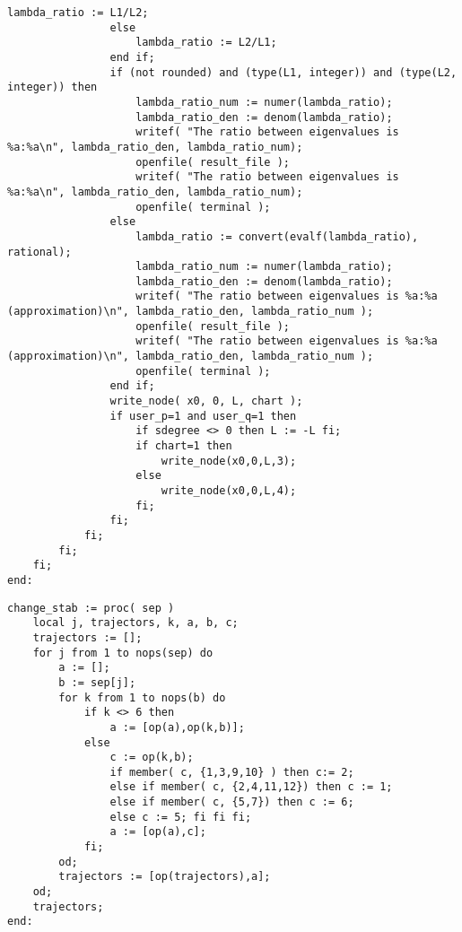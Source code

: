 \documentclass[a4paper,10pt]{article}
\begin{document}
\begin{lstlisting}[name=infinity]
                    lambda_ratio := L1/L2;
                else
                    lambda_ratio := L2/L1;
                end if;
                if (not rounded) and (type(L1, integer)) and (type(L2, integer)) then 
                    lambda_ratio_num := numer(lambda_ratio);
                    lambda_ratio_den := denom(lambda_ratio);
                    writef( "The ratio between eigenvalues is %a:%a\n", lambda_ratio_den, lambda_ratio_num);
                    openfile( result_file );
                    writef( "The ratio between eigenvalues is %a:%a\n", lambda_ratio_den, lambda_ratio_num);
                    openfile( terminal );
                else
                    lambda_ratio := convert(evalf(lambda_ratio), rational);
                    lambda_ratio_num := numer(lambda_ratio);
                    lambda_ratio_den := denom(lambda_ratio);
                    writef( "The ratio between eigenvalues is %a:%a (approximation)\n", lambda_ratio_den, lambda_ratio_num );
                    openfile( result_file );
                    writef( "The ratio between eigenvalues is %a:%a (approximation)\n", lambda_ratio_den, lambda_ratio_num );
                    openfile( terminal );
                end if;
                write_node( x0, 0, L, chart );
                if user_p=1 and user_q=1 then
                    if sdegree <> 0 then L := -L fi;
                    if chart=1 then
                        write_node(x0,0,L,3);
                    else
                        write_node(x0,0,L,4);
                    fi;
                fi;
            fi;
        fi;
    fi;
end:
\end{lstlisting}

\begin{lstlisting}[name=infinity]
change_stab := proc( sep )
    local j, trajectors, k, a, b, c;
    trajectors := [];
    for j from 1 to nops(sep) do
        a := [];
        b := sep[j];
        for k from 1 to nops(b) do
            if k <> 6 then
                a := [op(a),op(k,b)];
            else
                c := op(k,b);
                if member( c, {1,3,9,10} ) then c:= 2;
                else if member( c, {2,4,11,12}) then c := 1;
                else if member( c, {5,7}) then c := 6;
                else c := 5; fi fi fi;
                a := [op(a),c];
            fi;
        od;
        trajectors := [op(trajectors),a];
    od;
    trajectors;
end:
\end{lstlisting}
\end{document}
